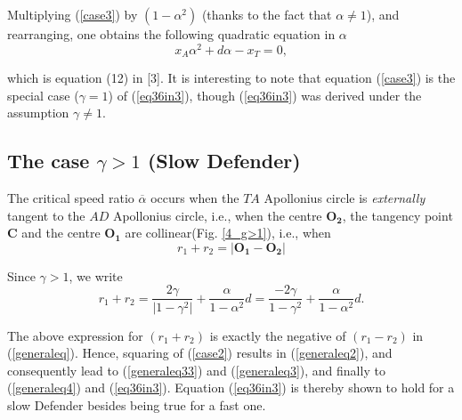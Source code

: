 \documentclass[final,5p,times,twocolumn]{elsarticle}
\begin{document}
Multiplying (\ref{case3}) by $(1-\alpha^{2})$ (thanks to the fact that $\alpha\neq1$), and rearranging, one obtains the following quadratic equation in $\alpha$
\begin{equation}
x_{A} \alpha^{2} + d \alpha - x_{T}=0,
\label{case3_SD}
\end{equation}

which is equation (12) in [3]. It is interesting to note that equation (\ref{case3}) is the special case ($\gamma=1$) of (\ref{eq36in3}), 
though (\ref{eq36in3}) was derived under the assumption $\gamma\neq1$.




\subsection{The case $\gamma>1$ (Slow Defender)}
The critical speed ratio $\overline{\alpha}$ occurs when the $TA$ Apollonius circle is \textit{externally} tangent to the $AD$ Apollonius circle, i.e., when the centre $\boldsymbol{O_{2}}$, the tangency point $\boldsymbol{C}$ and the centre $\boldsymbol{O_{1}}$ are collinear(Fig. \ref{4_g>1}), i.e., when 
\begin{equation}
r_{1}+r_{2}=\lvert\boldsymbol{O_{1}}-\boldsymbol{O_{2}}\rvert
\label{case2}
\end{equation}      

Since $\gamma>1$, we write
\begin{equation}
r_{1}+r_{2}=\dfrac{2\gamma}{\lvert1-\gamma^{2}\rvert}+\dfrac{\alpha}{1-\alpha^{2}}d=\dfrac{-2 \gamma}{1-\gamma^{2}}+\dfrac{\alpha}{1-\alpha^{2}}d.
\end{equation}

The above expression for $(r_1+r_2)$ is exactly the negative of $(r_1-r_2)$ in (\ref{generaleq}).
Hence, squaring of (\ref{case2}) results in (\ref{generaleq2}), and consequently lead to (\ref{generaleq33}) and (\ref{generaleq3}), and finally to (\ref{generaleq4}) and (\ref{eq36in3}).
Equation (\ref{eq36in3}) is thereby shown to hold for a slow Defender besides being true for a fast one.
\end{document}
